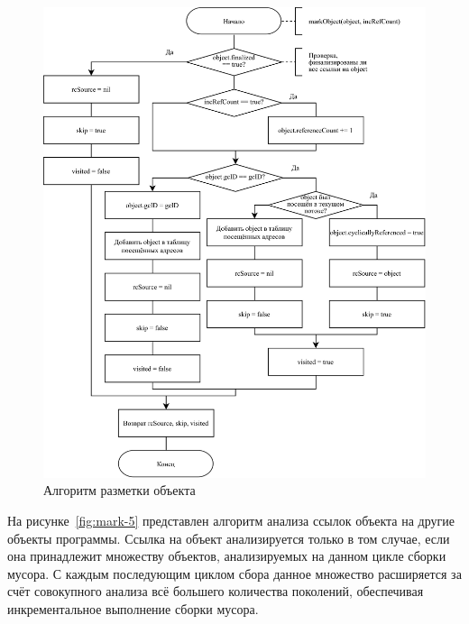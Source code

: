 \begin{figure}[H]
	\centering
	\includegraphics[width=\textwidth]{assets/mark-4.png}
	\caption{Алгоритм разметки объекта}
	\label{fig:mark-4}
\end{figure}

На рисунке~\ref{fig:mark-5} представлен алгоритм анализа ссылок объекта на другие объекты программы. Ссылка на объект анализируется только в том случае, если она принадлежит множеству объектов, анализируемых на данном цикле сборки мусора. С каждым последующим циклом сбора данное множество расширяется за счёт совокупного анализа всё большего количества поколений, обеспечивая инкрементальное выполнение сборки мусора.

